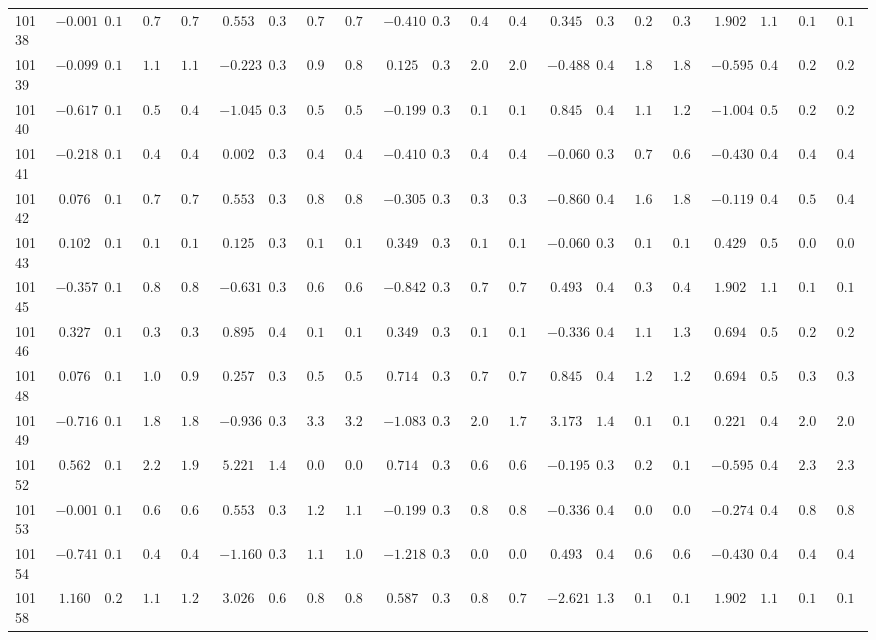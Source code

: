 \begin{landscape}
{\begin{longtable}{l|rrrr|rrrr|rrrr|rrrr|rrrr}
10138&$-0.001$&$0.159$&$0.790$&$0.756$&$ 0.553$&$0.395$&$0.711$&$0.716$&$-0.410$&$0.330$&$0.489$&$0.492$&$ 0.345$&$0.396$&$0.297$&$0.304$&$ 1.902$&$1.193$&$0.177$&$0.179$\tabularnewline
10139&$-0.099$&$0.157$&$1.163$&$1.175$&$-0.223$&$0.334$&$0.920$&$0.888$&$ 0.125$&$0.336$&$2.016$&$2.018$&$-0.488$&$0.420$&$1.866$&$1.854$&$-0.595$&$0.444$&$0.269$&$0.266$\tabularnewline
10140&$-0.617$&$0.157$&$0.514$&$0.490$&$-1.045$&$0.346$&$0.503$&$0.513$&$-0.199$&$0.330$&$0.115$&$0.115$&$ 0.845$&$0.472$&$1.194$&$1.258$&$-1.004$&$0.524$&$0.275$&$0.277$\tabularnewline
10141&$-0.218$&$0.154$&$0.484$&$0.470$&$ 0.002$&$0.349$&$0.430$&$0.449$&$-0.410$&$0.330$&$0.483$&$0.485$&$-0.060$&$0.384$&$0.718$&$0.632$&$-0.430$&$0.428$&$0.455$&$0.450$\tabularnewline
10142&$ 0.076$&$0.162$&$0.798$&$0.791$&$ 0.553$&$0.395$&$0.872$&$0.821$&$-0.305$&$0.330$&$0.364$&$0.365$&$-0.860$&$0.496$&$1.680$&$1.816$&$-0.119$&$0.426$&$0.500$&$0.494$\tabularnewline
10143&$ 0.102$&$0.163$&$0.125$&$0.127$&$ 0.125$&$0.358$&$0.118$&$0.119$&$ 0.349$&$0.345$&$0.140$&$0.137$&$-0.060$&$0.384$&$0.136$&$0.149$&$ 0.429$&$0.504$&$0.028$&$0.029$\tabularnewline
10145&$-0.357$&$0.154$&$0.864$&$0.851$&$-0.631$&$0.324$&$0.606$&$0.600$&$-0.842$&$0.347$&$0.785$&$0.731$&$ 0.493$&$0.411$&$0.398$&$0.413$&$ 1.902$&$1.193$&$0.177$&$0.179$\tabularnewline
10146&$ 0.327$&$0.176$&$0.384$&$0.356$&$ 0.895$&$0.420$&$0.102$&$0.108$&$ 0.349$&$0.345$&$0.135$&$0.136$&$-0.336$&$0.401$&$1.140$&$1.388$&$ 0.694$&$0.577$&$0.282$&$0.288$\tabularnewline
10148&$ 0.076$&$0.162$&$1.010$&$0.904$&$ 0.257$&$0.370$&$0.588$&$0.542$&$ 0.714$&$0.373$&$0.766$&$0.739$&$ 0.845$&$0.472$&$1.200$&$1.263$&$ 0.694$&$0.577$&$0.301$&$0.323$\tabularnewline
10149&$-0.716$&$0.161$&$1.830$&$1.804$&$-0.936$&$0.337$&$3.322$&$3.288$&$-1.083$&$0.371$&$2.091$&$1.735$&$ 3.173$&$1.487$&$0.122$&$0.133$&$ 0.221$&$0.462$&$2.008$&$2.064$\tabularnewline
10152&$ 0.562$&$0.194$&$2.241$&$1.987$&$ 5.221$&$1.494$&$0.080$&$0.089$&$ 0.714$&$0.373$&$0.625$&$0.606$&$-0.195$&$0.390$&$0.201$&$0.184$&$-0.595$&$0.444$&$2.314$&$2.363$\tabularnewline
10153&$-0.001$&$0.159$&$0.675$&$0.682$&$ 0.553$&$0.395$&$1.292$&$1.194$&$-0.199$&$0.330$&$0.880$&$0.877$&$-0.336$&$0.401$&$0.073$&$0.082$&$-0.274$&$0.422$&$0.853$&$0.854$\tabularnewline
10154&$-0.741$&$0.162$&$0.489$&$0.499$&$-1.160$&$0.358$&$1.153$&$1.092$&$-1.218$&$0.391$&$0.078$&$0.091$&$ 0.493$&$0.411$&$0.679$&$0.655$&$-0.430$&$0.428$&$0.455$&$0.450$\tabularnewline
10158&$ 1.160$&$0.269$&$1.112$&$1.220$&$ 3.026$&$0.623$&$0.865$&$0.850$&$ 0.587$&$0.361$&$0.827$&$0.784$&$-2.621$&$1.373$&$0.129$&$0.145$&$ 1.902$&$1.193$&$0.177$&$0.179$\tabularnewline
\hline
\end{longtable}}\end{landscape}



